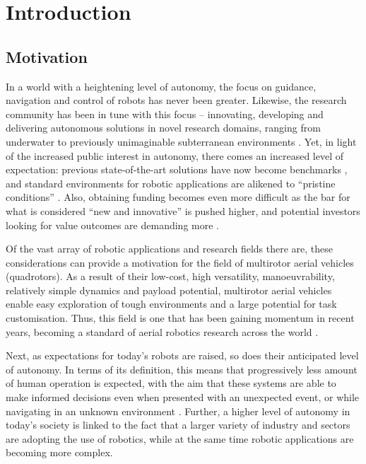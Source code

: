 \chapter{Introduction}
\label{chap:introduction}

\section{Motivation}

In a world with a heightening level of autonomy, the focus on guidance, navigation and control of robots has never been greater. Likewise, the research community has been in tune with this focus -- innovating, developing and delivering autonomous solutions in novel research domains, ranging from underwater \cite{eelumeSale} to previously unimaginable subterranean environments \cite{washingtonPost}. 
Yet, in light of the increased public interest in autonomy, there comes an increased level of expectation: previous state-of-the-art solutions have now become benchmarks \cite{openAIgym}, and standard environments for robotic applications are alikened to ``pristine conditions'' \cite{washingtonPost}. Also, obtaining funding becomes even more difficult as the bar for what is considered ``new and innovative'' is pushed higher, and potential investors looking for value outcomes are demanding more \cite{reasearchGrant, Gartner}.

Of the vast array of robotic applications and research fields there are, these considerations can provide a motivation for the field of multirotor aerial vehicles (quadrotors). As a result of their low-cost, high versatility, manoeuvrability, relatively simple dynamics and payload potential, multirotor aerial vehicles enable easy exploration of tough environments and a large potential for task customisation. Thus, this field is one that has been gaining momentum in recent years, becoming a standard of aerial robotics research across the world \cite{MultirotorAerialVehicles}.

Next, as expectations for today's robots are raised, so does their anticipated level of autonomy. In terms of its definition, this means that progressively less amount of human operation is expected, with the aim that these systems are able to make informed decisions even when presented with an unexpected event, or while navigating in an unknown environment \cite{TTK23}.
Further, a higher level of autonomy in today's society is linked to the fact that a larger variety of industry and sectors are adopting the use of robotics, while at the same time robotic applications are becoming more complex.

